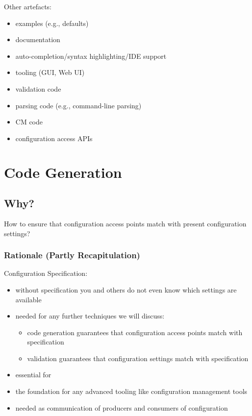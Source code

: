 \begin{frame}
	Other artefacts:

	\begin{itemize}
	\item examples (e.g., defaults)
	\item documentation
	\item auto-completion/syntax highlighting/IDE support
	\item tooling (GUI, Web UI)
	\item validation code
	\item parsing code (e.g., command-line parsing)
	\item CM code
	\item configuration access APIs
	\end{itemize}
\end{frame}



\section{Code Generation}

\subsection{Why?}

\begin{assignment}
	\begin{task}
	How to ensure that configuration access points match with present configuration settings?
	\end{task}
\end{assignment}

\begin{frame}
	\frametitle{Rationale (Partly Recapitulation)}
	Configuration Specification:
	\begin{itemize}
	\item without specification you and others do not even know which settings are available
	\item needed for any further techniques we will discuss:
		\begin{itemize}
		\color{red}
		\item code generation guarantees that configuration access points match with specification
		\item validation guarantees that configuration settings match with specification
		\end{itemize}
	\item essential for ~\citet{holland2001nofutz}
	\item the foundation for any advanced tooling like configuration management tools
	\item needed as communication of producers and consumers of configuration
	\end{itemize}
\end{frame}

